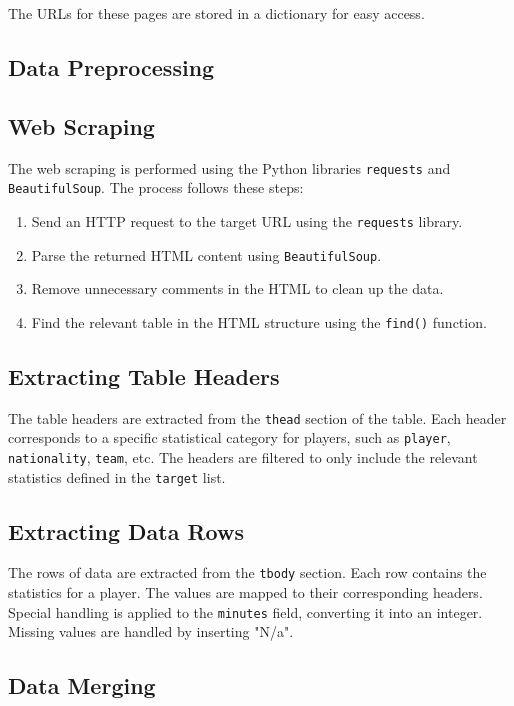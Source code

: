 \documentclass[a4paper,12pt]{article}
\begin{document}
The URLs for these pages are stored in a dictionary for easy access.

\subsection{Data Preprocessing}

\subsection{Web Scraping}

The web scraping is performed using the Python libraries \texttt{requests} and \texttt{BeautifulSoup}. The process follows these steps:

\begin{enumerate}
    \item Send an HTTP request to the target URL using the \texttt{requests} library.
    \item Parse the returned HTML content using \texttt{BeautifulSoup}.
    \item Remove unnecessary comments in the HTML to clean up the data.
    \item Find the relevant table in the HTML structure using the \texttt{find()} function.
\end{enumerate}

\subsection{Extracting Table Headers}

The table headers are extracted from the \texttt{thead} section of the table. Each header corresponds to a specific statistical category for players, such as \texttt{player}, \texttt{nationality}, \texttt{team}, etc. The headers are filtered to only include the relevant statistics defined in the \texttt{target} list.

\subsection{Extracting Data Rows}

The rows of data are extracted from the \texttt{tbody} section. Each row contains the statistics for a player. The values are mapped to their corresponding headers. Special handling is applied to the \texttt{minutes} field, converting it into an integer. Missing values are handled by inserting "N/a".

\subsection{Data Merging}
\end{document}
